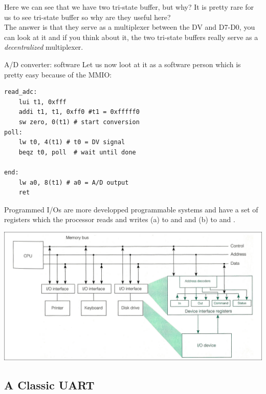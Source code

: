 \begin{framedremark}
Here we can see that we have two tri-state buffer, but why? It is pretty rare for us to see tri-state buffer so why are they useful here?\\
The answer is that they serve as a multiplexer between the DV and D7-D0, you can look at it and if you think about it, the two tri-state buffers really serve as a \textit{decentralized} multiplexer.
\end{framedremark}

\begin{parag}{A/D converter: software}
    Let us now loot at it as a software person which is pretty easy because of the MMIO:
	\begin{lstlisting}[language={[RISC-V]Assembler}]
read_adc: 
	lui t1, 0xfff 
	addi t1, t1, 0xff0 #t1 = 0xfffff0
	sw zero, 0(t1) # start conversion 
poll:
	lw t0, 4(t1) # t0 = DV signal 
	beqz t0, poll  # wait until done

end:
	lw a0, 8(t1) # a0 = A/D output 
	ret
	\end{lstlisting}
\end{parag}




\begin{parag}{Programmed I/Os}
     are more developped programmable systems and have a set of registers which the processor reads and writes (a) to  and  and (b) to  and .
	\begin{center}
	\includegraphics[scale=0.2]{screenshots/2025-10-22_10.png}
	\end{center}
\end{parag}

\subsection{A Classic UART}

